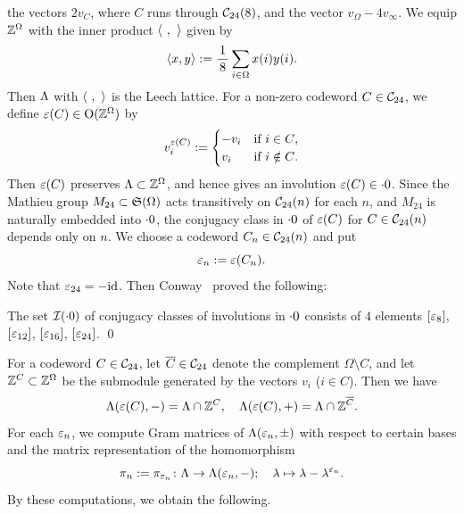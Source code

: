 \documentclass{amsart} %
\begin{document}
the vectors $2v_C$,
where $C$ runs through $\mathord{\mathcal{C}}_{24}(8)$, and 
the vector $v_{\Omega}-4v_{\infty}$.
%
%
We equip $\mathord{\mathbb{Z}}^{\Omega}$ with the inner product $\langle \phantom{i}, \phantom{i} \rangle$ 
given by
\[
\langle x, y \rangle:=\frac{1}{\,8\,} \sum_{i\in\Omega} x(i) y(i).
\]
Then $\Lambda$ with $\langle \phantom{i}, \phantom{i} \rangle$ is the Leech lattice.
For a non-zero codeword $C\in \mathord{\mathcal{C}}_{24}$,
we define $\varepsilon(C)\in \mathord{\mathrm{O}}(\mathord{\mathbb{Z}}^{\Omega})$ by 
\[
v_i^{\varepsilon(C)}:=
\begin{cases}
-v_i & \textrm{if $i\in C$}, \\
v_i& \textrm{if $i\notin C$}.
\end{cases}
\]
Then $\varepsilon(C)$ 
preserves %
$\Lambda\subset \mathord{\mathbb{Z}}^{\Omega}$, and hence gives 
an involution $\varepsilon(C)\in \cdot 0$. 
Since the Mathieu group $M_{24}\subset \mathord{\mathfrak{S}}(\Omega)$ acts transitively
on $\mathord{\mathcal{C}}_{24}(n)$ for each $n$, 
and $M_{24}$ is naturally embedded into $\cdot 0$,
the conjugacy class in $\cdot 0$ of $\varepsilon(C)$ for $C\in \mathord{\mathcal{C}}_{24}(n)$ 
depends only on $n$.
We choose a codeword $C_n\in \mathord{\mathcal{C}}_{24}(n)$ and put
\[
\varepsilon_n:=\varepsilon(C_n).
\]
Note that $\varepsilon_{24}=-\mathord{\mathrm{id}}$.
Then Conway~\cite[Chapter 10, Section 3.7]{theCSbook} proved the following:
%
\begin{theorem}[Conway]
The set $\mathord{\mathcal{I}}(\cdot 0)$ of conjugacy classes of involutions in $\cdot 0$ 
consists of $4$ elements $[\varepsilon_8]$, $[\varepsilon_{12}]$, $[\varepsilon_{16}]$, $[\varepsilon_{24}]$.
\qed
\end{theorem}
%
%
%
For a codeword $C\in \mathord{\mathcal{C}}_{24}$,
let $\overline{C}\in \mathord{\mathcal{C}}_{24}$ denote the complement $\Omega\setminus C$,
and let 
$\mathord{\mathbb{Z}}^{C}\subset \mathord{\mathbb{Z}}^{\Omega}$ be 
the submodule generated by the vectors $v_i$ ($i\in C$).
Then we have
%
\begin{equation}\label{eq:Leechveppm}
\Lambda(\varepsilon(C), -)=\Lambda\cap \mathord{\mathbb{Z}}^{C},
\quad
\Lambda(\varepsilon(C), +)=\Lambda\cap \mathord{\mathbb{Z}}^{\overline{C}}.
\end{equation}
%
For each $\varepsilon_n$,
we compute Gram matrices of $\Lambda(\varepsilon_n, \pm)$ 
with respect to certain bases
and the matrix representation of the homomorphism 
\[
\pi_n:=\pi_{\varepsilon_n}\colon \Lambda \to \Lambda(\varepsilon_n, -); \quad \lambda\mapsto \lambda-\lambda^{\varepsilon_n}.
\]
By these computations,
 we obtain the following.
\end{document}
